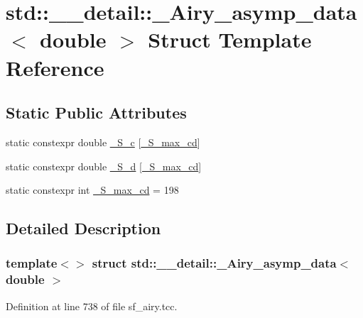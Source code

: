 \hypertarget{structstd_1_1____detail_1_1__Airy__asymp__data_3_01double_01_4}{}\section{std\+:\+:\+\_\+\+\_\+detail\+:\+:\+\_\+\+Airy\+\_\+asymp\+\_\+data$<$ double $>$ Struct Template Reference}
\label{structstd_1_1____detail_1_1__Airy__asymp__data_3_01double_01_4}
\subsection*{Static Public Attributes}
\begin{DoxyCompactItemize}
\item 
static constexpr double \hyperlink{structstd_1_1____detail_1_1__Airy__asymp__data_3_01double_01_4_a38e855b175c89166c4220cacd07ca1c7}{\+\_\+\+S\+\_\+c} \mbox{[}\hyperlink{structstd_1_1____detail_1_1__Airy__asymp__data_3_01double_01_4_a38e485184d2762e83a27937efc343d01}{\+\_\+\+S\+\_\+max\+\_\+cd}\mbox{]}
\item 
static constexpr double \hyperlink{structstd_1_1____detail_1_1__Airy__asymp__data_3_01double_01_4_aeaf6aab79b67a46932e9d16864ad0f78}{\+\_\+\+S\+\_\+d} \mbox{[}\hyperlink{structstd_1_1____detail_1_1__Airy__asymp__data_3_01double_01_4_a38e485184d2762e83a27937efc343d01}{\+\_\+\+S\+\_\+max\+\_\+cd}\mbox{]}
\item 
static constexpr int \hyperlink{structstd_1_1____detail_1_1__Airy__asymp__data_3_01double_01_4_a38e485184d2762e83a27937efc343d01}{\+\_\+\+S\+\_\+max\+\_\+cd} = 198
\end{DoxyCompactItemize}


\subsection{Detailed Description}
\subsubsection*{template$<$$>$\newline
struct std\+::\+\_\+\+\_\+detail\+::\+\_\+\+Airy\+\_\+asymp\+\_\+data$<$ double $>$}



Definition at line 738 of file sf\+\_\+airy.\+tcc.



